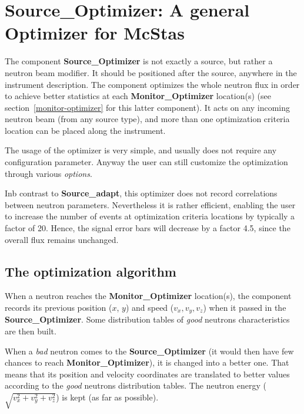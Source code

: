\section{Source\_Optimizer: A general Optimizer for McStas}
\label{source-optimizer}

The component {\bf Source\_Optimizer} is not exactly a source, 
but rather a neutron beam modifier. 
It should be positioned after the source, anywhere in the instrument description.
The component  optimizes the whole neutron flux
in order to achieve better statistics at each {\bf Monitor\_Optimizer}
location(s) (see section~\ref{monitor-optimizer} for this latter
component). It acts on any incoming neutron beam (from any source
type), and more than one optimization criteria location can be placed
along the instrument.

The usage of the optimizer is very simple, and usually does not require
any configuration parameter. Anyway the user can still customize the
optimization through various {\it options}.

Inb contrast to {\bf Source\_adapt}, this optimizer does not
record correlations between neutron parameters. 
Nevertheless it is rather efficient, 
enabling the user to increase the number of events
at optimization criteria locations by typically a factor of 20.
Hence, the signal error bars will decrease by a factor 4.5, 
since the overall flux remains unchanged.

\subsection{The optimization algorithm}

When a neutron reaches the {\bf Monitor\_Optimizer} location(s), the
component records its previous position ($x$, $y$) and speed ($v_x,
v_y, v_z$) when it passed in the {\bf Source\_Optimizer}. Some
distribution tables of {\it good} neutrons characteristics are then
built.

When a {\it bad} neutron comes to the {\bf Source\_Optimizer} (it would
then have few chances to reach {\bf Monitor\_Optimizer}), it is changed
into a better one. That means that its position and velocity coordinates
are translated to better values according to the {\it good} neutrons
distribution tables. The neutron energy 
($\sqrt{v_x^2 + v_y^2 + v_z^2}$) is kept (as far as possible).

